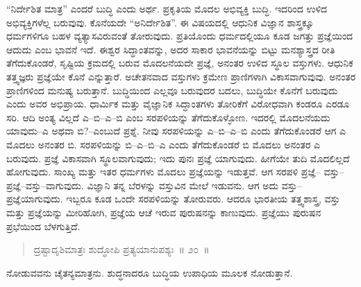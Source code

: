 “ನಿರ್ದೇಶಿತ ಮಾತ್ರ” ಎಂದರೆ ಬುದ್ಧಿ ಎಂದು ಅರ್ಥ. ಪ್ರಕೃತಿಯ ಮೊದಲ ಅಭಿವ್ಯಕ್ತಿ ಬುದ್ಧಿ. ಇದರಿಂದ ಉಳಿದ ಅಭಿವ್ಯಕ್ತಿಗಳೆಲ್ಲ ಬರುವುವು. ಕೊನೆಯದೇ “ಅನಿರ್ದೇಶಿತ”. ಈ ವಿಷಯದಲ್ಲಿ ಆಧುನಿಕ ವಿಜ್ಞಾನ ಶಾಸ್ತ್ರಕ್ಕೂ ಧರ್ಮಗಳಿಗೂ ಬಹಳ ವ್ಯತ್ಯಾಸವಿರುವಂತೆ ತೋರುವುದು. ಪ್ರತಿಯೊಂದು ಧರ್ಮದಲ್ಲಿಯೂ ಕೂಡ ಜಗತ್ತು ಪ್ರಜ್ಞೆಯಿಂದ ಆದುದು ಎಂಬ ಭಾವನೆ ಇದೆ. ಈಶ್ವರ ಸಿದ್ಧಾಂತವನ್ನು, ಅದರ ಸಾಕಾರ ಭಾವನೆಯನ್ನು ಬಿಟ್ಟು ಮನಶ್ಯಾಸ್ತ್ರದ ರೀತಿ ತೆಗೆದುಕೊಂಡರೆ, ಸೃಷ್ಟಿಯ ಕ್ರಮದಲ್ಲಿ ಬರುವ ಮೊದಲನೆಯದೇ ಪ್ರಜ್ಞೆ, ಅನಂತರ ಉಳಿದ ಸ್ಥೂಲ ವಸ್ತುಗಳು. ಆಧುನಿಕ ತತ್ತ್ವಜ್ಞರು ಪ್ರಜ್ಞೆಯೇ ಕೊನೆ ಎನ್ನುತ್ತಾರೆ. ಅಚೇತನವಾದ ವಸ್ತುಗಳು ಕ್ರಮೇಣ ಪ್ರಾಣಿಗಳಾಗಿ ವಿಕಾಸವಾಗುವುವು. ಅನಂತರ ಪ್ರಾಣಿಗಳಿಂದ ಮನುಷ್ಯ ಬರುತ್ತಾನೆ. ಬುದ್ಧಿಯಿಂದ ಎಲ್ಲವೂ ಬರುವುದರ ಬದಲು, ಬುದ್ಧಿಯೇ ಕೊನೆಗೆ ಬರುವುದು ಎಂದು ಅವರ ಅಭಿಪ್ರಾಯ. ಧಾರ್ಮಿಕ ಮತ್ತು ವೈಜ್ಞಾನಿಕ ಸಿದ್ಧಾಂತಗಳು ತೋರಿಕೆಗೆ ವಿರೋಧವಾಗಿ ಕಂಡರೂ ಎರಡೂ ಸರಿ. ಆದಿ ಅಂತ್ಯ ವಿಲ್ಲದೆ ಎ–ಬಿ–ಎ–ಬಿ ಎಂಬ ಸರಪಳಿಯನ್ನು ತೆಗೆದುಕೊಳ್ಳೋಣ. ಇದರಲ್ಲಿ ಮೊದಲನೆಯದು ಯಾವುದು–ಎ ಅಥವಾ ಬಿ?–ಎಂಬುದೆ ಪ್ರಶ್ನೆ. ನೀವು ಸರಪಳಿಯನ್ನು ಎ–ಬಿ–ಎ–ಬಿ ಎಂದು ತೆಗೆದುಕೊಂಡರೆ ಆಗ ಎ ಮೊದಲು ಅನಂತರ ಬಿ. ಸರಪಳಿಯನ್ನು ಬಿ–ಎ–ಬಿ–ಎ ಎಂದು ತೆಗೆದುಕೊಂಡರೆ ಬಿ ಮೊದಲು ಅನಂತರ ಎ ಬರುವುದು. ಪ್ರಜ್ಞೆ ವಿಕಾಸವಾಗಿ ಸ್ಥೂಲವಾಗುವುದು; ಇದು ಪುನಃ ಪ್ರಜ್ಞೆ ಯಾಗುವುದು. ಹೀಗೆಯೇ ತುದಿ ಮೊದಲಿಲ್ಲದೆ ಹೋಗುವುದು. ಸಾಂಖ್ಯ ಮತ್ತು ಇತರ ಧರ್ಮಗಳು ಮೊದಲು ಪ್ರಜ್ಞೆಯನ್ನು ಇಡುತ್ತವೆ. ಆಗ ಸರಪಳಿ ಪ್ರಜ್ಞೆ– ವಸ್ತು–ಪ್ರಜ್ಞೆ–ವಸ್ತು–ವಾಗುವುದು. ವಿಜ್ಞಾನಿ ತನ್ನ ಬೆರಳನ್ನು ವಸ್ತುವಿನ ಮೇಲೆ ಇಡುವನು. ಆಗ ಅದು ವಸ್ತು–ಪ್ರಜ್ಞೆಯಾಗುವುದು. ಇಬ್ಬರೂ ಕೂಡ ಒಂದೇ ಸರಪಳಿಯನ್ನು ತೋರುವರು. ಆದರೂ ಭಾರತೀಯ ತತ್ತ್ವಶಾಸ್ತ್ರ, ವಸ್ತು ಮತ್ತು ಪ್ರಜ್ಞೆಯನ್ನು ಮೀರಿಹೋಗಿ, ಪ್ರಜ್ಞೆಯ ಆಚೆ ಇರುವ ಪುರುಷನನ್ನು ಕಾಣುವುದು. ಪ್ರಜ್ಞೆಯು ಪುರುಷನ ಪ್ರಭೆಯಿಂದ ಬೆಳಗುತ್ತಿದೆ. 

\vspace{-0.4cm}

\begin{verse}
ದ್ರಷ್ಟಾದೃಶಿಮಾತ್ರಃ ಶುದ್ಧೋಪಿ ಪ್ರತ್ಯಯಾನುಪಶ್ಯಃ~॥ ೨೦~॥
\end{verse}

\vspace{-0.4cm}

ನೋಡುವವನು ಚೈತನ್ಯಮಾತ್ರನು. ಶುದ್ಧನಾದರೂ ಬುದ್ಧಿಯ ಉಪಾಧಿಯ ಮೂಲಕ ನೋಡುತ್ತಾನೆ. 

